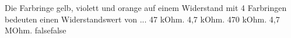     {Die Farbringe gelb, violett und orange auf einem Widerstand mit 4 Farbringen bedeuten einen Widerstandswert von ...}
    {47 kOhm.}
    {4,7 kOhm.}
    {470 kOhm.}
    {4,7 MOhm.}
    {false}{false}